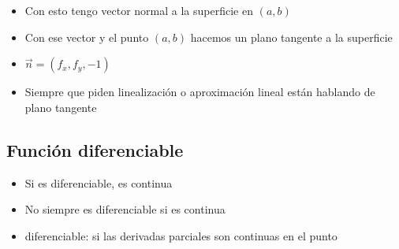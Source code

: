 \begin{itemize}
    \item Con esto tengo vector normal a la superficie en \((a,b)\)
    \item Con ese vector y el punto \((a,b)\) hacemos un plano tangente a la
          superficie
    \item \( \vec{n} = (f_x, f_y, -1)\)
    \item Siempre que piden linealización o aproximación lineal están hablando de
          plano tangente
\end{itemize}

\subsection{Función diferenciable}
\begin{itemize}
    \item Si es diferenciable, es continua
    \item No siempre es diferenciable si es continua
    \item diferenciable: si las derivadas parciales son continuas en el punto
\end{itemize}